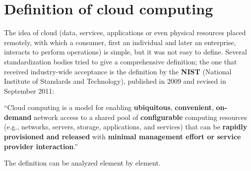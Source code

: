 \documentclass[11pt,a4paper,openany]{report}
\begin{document}
\section{Definition of cloud computing}

The idea of cloud (data, services, applications or even physical resources placed remotely, with which a consumer, first an individual and later an enterprise, interacts to perform operations) is simple, but it was not easy to define. Several standardization bodies tried to give a comprehensive definition; the one that received industry-wide acceptance is the definition by the \textbf{NIST} (National Institute of Standards and Technology), published in 2009 and revised in September 2011:

\begin{notebox}
	``Cloud computing is a model for enabling \textbf{ubiquitous}, \textbf{convenient}, \textbf{on-demand} network access to a shared pool of \textbf{configurable} computing resources (e.g., networks, servers, storage, applications, and services) that can be \textbf{rapidly provisioned and released} with \textbf{minimal management effort or service provider interaction}.''
\end{notebox}

The definition can be analyzed element by element.
\end{document}
